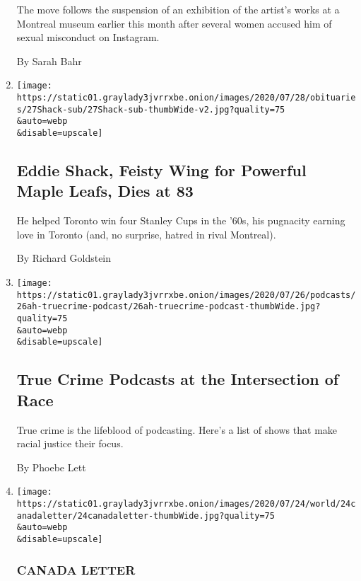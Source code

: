 \begin{enumerate}
  The move follows the suspension of an exhibition of the artist's works
  at a Montreal museum earlier this month after several women accused
  him of sexual misconduct on Instagram.

  By Sarah Bahr
\item
  \href{/2020/07/27/sports/hockey/eddie-shack-feisty-wing-for-powerful-maple-leafs-dies-at-83.html}{}

  \texttt{[image: https://static01.graylady3jvrrxbe.onion/images/2020/07/28/obituaries/27Shack-sub/27Shack-sub-thumbWide-v2.jpg?quality=75\\\&auto=webp\\\&disable=upscale]}

  \hypertarget{eddie-shack-feisty-wing-for-powerful-maple-leafs-dies-at-83}{%
  \subsection{Eddie Shack, Feisty Wing for Powerful Maple Leafs, Dies at
  83}\label{eddie-shack-feisty-wing-for-powerful-maple-leafs-dies-at-83}}

  He helped Toronto win four Stanley Cups in the '60s, his pugnacity
  earning love in Toronto (and, no surprise, hatred in rival Montreal).

  By Richard Goldstein
\item
  \href{/2020/07/25/at-home/coronavirus-true-crime-podcasts-race.html}{}

  \texttt{[image: https://static01.graylady3jvrrxbe.onion/images/2020/07/26/podcasts/26ah-truecrime-podcast/26ah-truecrime-podcast-thumbWide.jpg?quality=75\\\&auto=webp\\\&disable=upscale]}

  \hypertarget{true-crime-podcasts-at-the-intersection-of-race}{%
  \subsection{True Crime Podcasts at the Intersection of
  Race}\label{true-crime-podcasts-at-the-intersection-of-race}}

  True crime is the lifeblood of podcasting. Here's a list of shows that
  make racial justice their focus.

  By Phoebe Lett
\item
  \href{/2020/07/24/world/canada/cronk.html}{}

  \texttt{[image: https://static01.graylady3jvrrxbe.onion/images/2020/07/24/world/24canadaletter/24canadaletter-thumbWide.jpg?quality=75\\\&auto=webp\\\&disable=upscale]}

  \hypertarget{canada-letter-1}{%
  \subsubsection{CANADA LETTER}\label{canada-letter-1}}


\end{enumerate}
